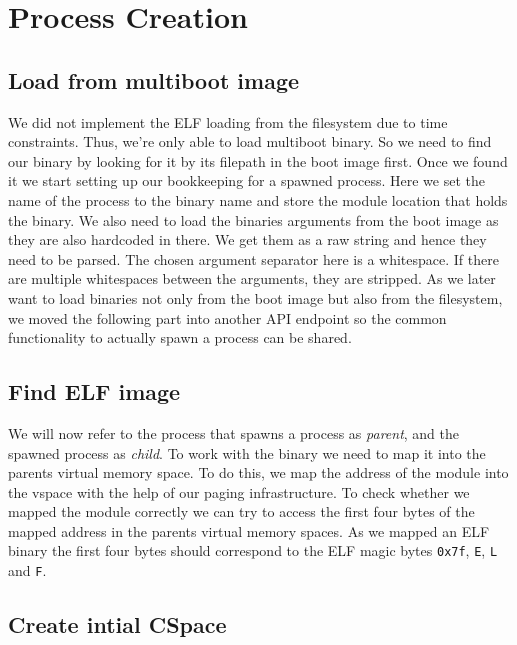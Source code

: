 \section{Process Creation}

\subsection{Load from multiboot image}
 We did not implement the ELF loading from the filesystem due to time constraints. Thus, we're only able to load multiboot binary. So we need to find our binary by looking for it by its filepath in the boot image first.  Once we found it we start setting up our bookkeeping for a spawned process. Here we set the name of the process to the binary name and store the module location that holds the binary.  We also need to load the binaries arguments from the boot image as they are also hardcoded in there. We get them as a raw string and hence they need to be parsed. The chosen argument separator here is a whitespace. If there are multiple whitespaces between the arguments, they are stripped.  As we later want to load binaries not only from the boot image but also from the filesystem, we moved the following part into another API endpoint so the common functionality to actually spawn a process can be shared.

\subsection{Find ELF image}
We will now refer to the process that spawns a process as \emph{parent}, and the spawned process as \emph{child}.  To work with the binary we need to map it into the parents virtual memory space. To do this, we map the address of the module into the vspace with the help of our paging infrastructure. To check whether we mapped the module correctly we can try to access the first four bytes of the mapped address in the parents virtual memory spaces. As we mapped an ELF binary the first four bytes should correspond to  the ELF magic bytes \verb|0x7f|, \verb|E|, \verb|L| and \verb|F|.

\subsection{Create intial CSpace} 

